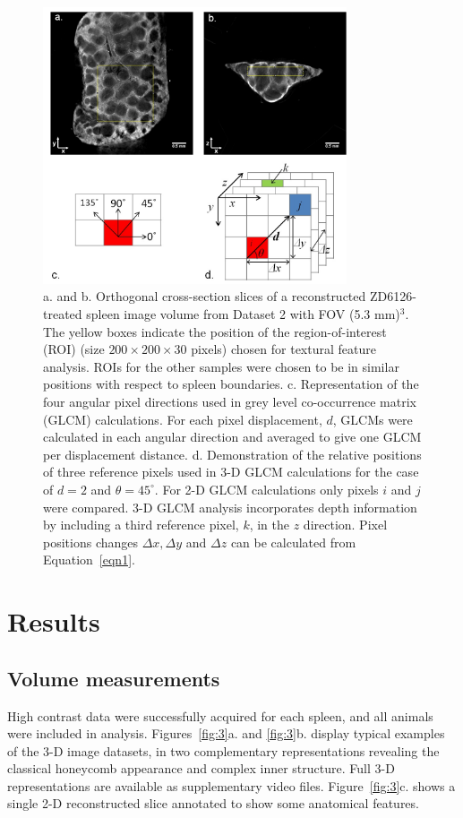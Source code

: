 	
	\begin{figure}%
		\centering
		\includegraphics[width=0.8\textwidth]{spleen_img/spleen_Figure2.jpg}
		\caption{a. and b. Orthogonal cross-section slices of a reconstructed ZD6126-treated spleen image volume from Dataset 2 with FOV (5.3 mm)$^3$. The yellow boxes indicate the position of the region-of-interest (ROI) (size $200 \times 200 \times 30$ pixels) chosen for textural feature analysis. ROIs for the other samples were chosen to be in similar positions with respect to spleen boundaries. c. Representation of the four angular pixel directions used in grey level co-occurrence matrix (GLCM) calculations. For each pixel displacement, $d$, GLCMs were calculated in each angular direction and averaged to give one GLCM per displacement distance. d. Demonstration of the relative positions of three reference pixels used in 3-D GLCM calculations for the case of $d = 2$ and $\theta=45^{\circ}$. For 2-D GLCM calculations only pixels $i$ and $j$ were compared. 3-D GLCM analysis incorporates depth information by including a third reference pixel, $k$, in the $z$ direction. Pixel positions changes  $\Delta x, \Delta y$  and $\Delta z$  can be calculated from Equation~\ref{eqn1}.}
		\label{fig:2}
	\end{figure}
	
	
	
	
	
	\section{Results}
	\subsection{Volume measurements}
	High contrast data were successfully acquired for each spleen, and all animals were included in analysis. Figures~\ref{fig:3}a. and \ref{fig:3}b. display typical examples of the 3-D image datasets, in two complementary representations revealing the classical honeycomb appearance and complex inner structure. Full 3-D representations are available as supplementary video files. Figure~\ref{fig:3}c. shows a single 2-D reconstructed slice annotated to show some anatomical features. 
	
